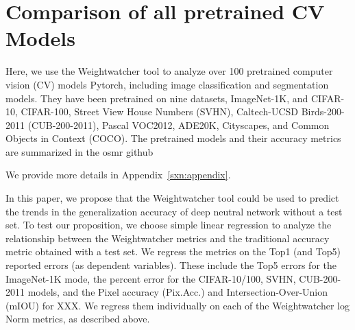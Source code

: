 \section{Comparison of all pretrained CV Models}
\label{sxn:all_cv_models}


Here, we use the Weightwatcher tool to analyze over 100 pretrained computer vision (CV) models Pytorch, including image classification and segmentation models.  They have been pretrained on nine datasets, ImageNet-1K, and CIFAR-10, CIFAR-100, Street View House Numbers (SVHN), Caltech-UCSD Birds-200-2011 (CUB-200-2011), Pascal VOC2012, ADE20K, Cityscapes, and Common Objects in Context (COCO). The pretrained models and their accuracy metrics are summarized in the osmr github 

We provide more details in Appendix~\ref{sxn:appendix}.



In this paper, we propose that the Weightwatcher tool could be used to predict the trends in the generalization accuracy of deep neutral network without a test set. To test our proposition, we choose simple linear regression to analyze the relationship between the Weightwatcher metrics and the traditional accuracy metric obtained with a test set.
We regress the metrics on the Top1 (and Top5) reported errors (as dependent variables).  These include the Top5 errors for the ImageNet-1K mode, the percent error for the CIFAR-10/100, SVHN, CUB-200-2011 models, and the Pixel accuracy (Pix.Acc.) and Intersection-Over-Union (mIOU) for XXX.
We regress them individually on each of the Weightwatcher log Norm metrics, as described above.


